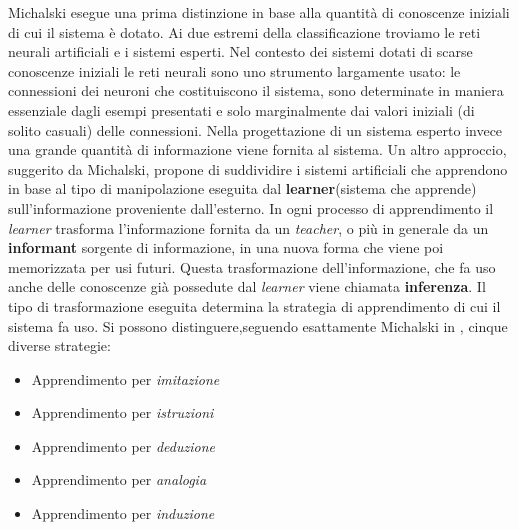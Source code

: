Michalski esegue una prima distinzione in base alla quantità di conoscenze
iniziali di cui il sistema è dotato. Ai due estremi della classificazione troviamo
le reti neurali artificiali e i sistemi esperti. Nel contesto dei sistemi dotati di
scarse conoscenze iniziali le reti neurali sono uno strumento largamente usato:
le connessioni dei neuroni che costituiscono il sistema, sono determinate in
maniera essenziale dagli esempi presentati e solo marginalmente
dai valori iniziali (di solito casuali) delle connessioni. Nella progettazione di un sistema esperto invece una grande quantità di informazione viene fornita al sistema.
Un altro approccio, suggerito da Michalski, propone di suddividire i
sistemi artificiali che apprendono in base al tipo di manipolazione eseguita dal \textbf{learner}(sistema che apprende) sull’informazione proveniente dall'esterno. In ogni processo di apprendimento il \emph{learner} trasforma l’informazione fornita da un \textit{teacher}, o più in generale da un \textbf{informant} sorgente di informazione, in una nuova forma che viene poi memorizzata per usi futuri. Questa trasformazione dell’informazione, che fa uso anche delle conoscenze già possedute dal \emph{learner} viene chiamata \textbf{inferenza}. Il tipo di trasformazione eseguita determina la strategia di apprendimento di cui il sistema fa uso. Si possono distinguere,seguendo esattamente Michalski in \cite{Mic86a} , cinque diverse strategie:
\begin{itemize}
\item Apprendimento per \textit{imitazione}
\item Apprendimento per \textit{istruzioni}
\item Apprendimento per \textit{deduzione}
\item Apprendimento per \textit{analogia}
\item Apprendimento per \textit{induzione} 
\end{itemize}

